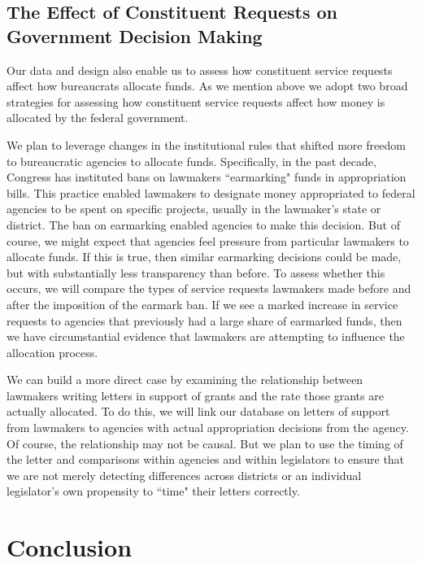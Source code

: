 \documentclass{article}
\begin{document}
\subsection{The Effect of Constituent Requests on Government Decision Making }
Our data and design also enable us to assess how constituent service requests affect how bureaucrats allocate funds.  As we mention above we adopt two broad strategies for assessing how constituent service requests affect how money is allocated by the federal government. 

We plan to leverage changes in the institutional rules that shifted more freedom to bureaucratic agencies to allocate funds.  Specifically, in the past decade, Congress has instituted bans on lawmakers ``earmarking" funds in appropriation bills. This practice enabled lawmakers to designate money appropriated to federal agencies to be spent on specific projects, usually in the lawmaker's state or district.  The ban on earmarking enabled agencies to make this decision.  But of course, we might expect that agencies feel pressure from particular lawmakers to allocate funds.  If this is true, then similar earmarking decisions could be made, but with substantially less transparency than before.  To assess whether this occurs, we will compare the types of service requests lawmakers made before and after the imposition of the earmark ban.  If we see a marked increase in service requests to agencies that previously had a large share of earmarked funds, then we have circumstantial evidence that lawmakers are attempting to influence the allocation process. 

We can build a more direct case by examining the relationship between lawmakers writing letters in support of grants and the rate those grants are actually allocated.  To do this, we will link our database on letters of support from lawmakers to agencies with actual appropriation decisions from the agency.  Of course, the relationship may not be causal.  But we plan to use the timing of the letter and comparisons within agencies and within legislators to ensure that we are not merely detecting differences across districts or an individual legislator's own propensity to ``time" their letters correctly. 


\section{Conclusion}
\end{document}
